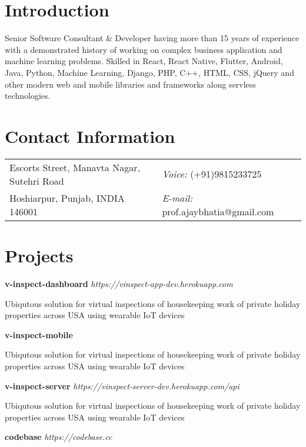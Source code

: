 \documentclass[margin,line]{res}
\begin{document}

\begin{resume}
	
\section{\sc Introduction}
Senior Software Consultant \& Developer having more than 15 years of experience with a demonstrated history of working on complex business application and machine learning problems. Skilled in React, React Native, Flutter, Android, Java, Python, Machine Learning, Django, PHP, C++, HTML, CSS, jQuery and other modern web and mobile libraries and frameworks along servless technologies.
	
\section{\sc Contact Information}
\vspace{.05in}
\begin{tabular}{@{}p{4in}p{4in}}
Escorts Street, Manavta Nagar, Sutehri Road & {\it Voice:}  (+91)9815233725\\
Hoshiarpur, Punjab, INDIA 146001 & {\it E-mail:}  prof.ajaybhatia@gmail.com\\
\end{tabular}

\section{\sc Projects} 

\textbf{v-inspect-dashboard} {\em https://vinspect-app-dev.herokuapp.com}

Ubiqutous solution for virtual inspections of housekeeping work of private holiday properties across USA using wearable IoT devices

\textbf{v-inspect-mobile}
	
Ubiqutous solution for virtual inspections of housekeeping work of private holiday properties across USA using wearable IoT devices

\textbf{v-inspect-server} {\em https://vinspect-server-dev.herokuapp.com/api}

Ubiqutous solution for virtual inspections of housekeeping work of private holiday properties across USA using wearable IoT devices

\textbf{codebase} {\em https://codebase.cc}


\end{resume}
\end{document}
